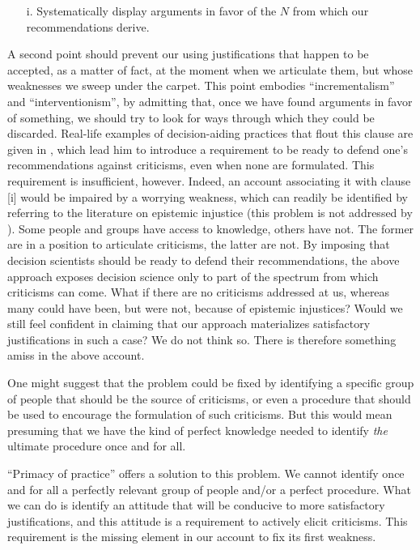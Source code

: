 \documentclass[preprint, french, english, 11pt, authoryear]{elsarticle}%
\begin{document}
\begin{itemize}
\item[i.]	Systematically display arguments in favor of the $N$ from which our recommendations derive.
\end{itemize}

A second point should prevent our using justifications that happen to be accepted, as a matter of fact, at the moment when we articulate them, but whose weaknesses we sweep under the carpet. This point embodies “incrementalism” and ``interventionism'', by admitting that, once we have found arguments in favor of something, we should try to look for ways through which they could be discarded. Real-life examples of decision-aiding practices that flout this clause are given in \cite{meinard_what_2017}, which lead him to introduce a requirement to be ready to defend one's recommendations against criticisms, even when none are formulated. This requirement is insufficient, however. Indeed, an account associating it with clause [i] would be impaired by a worrying weakness, which can readily be identified by referring to the literature on epistemic injustice \citep{fricker_epistemic_2007} (this problem is not addressed by \cite{meinard_what_2017}). Some people and groups have access to knowledge, others have not. The former are in a position to articulate criticisms, the latter are not. By imposing that decision scientists should be ready to defend their recommendations, the above approach exposes decision science only to part of the spectrum from which criticisms can come. What if there are no criticisms addressed at us, whereas many could have been, but were not, because of epistemic injustices? Would we still feel confident in claiming that our approach materializes satisfactory justifications in such a case? We do not think so. There is therefore something amiss in the above account.

One might suggest that the problem could be fixed by identifying a specific group of people that should be the source of criticisms, or even a procedure that should be used to encourage the formulation of such criticisms. But this would mean presuming that we have the kind of perfect knowledge needed to identify \emph{the} ultimate procedure once and for all.

``Primacy of practice” offers a solution to this problem. We cannot identify once and for all a perfectly relevant group of people and/or a perfect procedure. What we can do is identify an attitude that will be conducive to more satisfactory justifications, and this attitude is a requirement to actively elicit criticisms. This requirement is the missing element in our account to fix its first weakness.
\end{document}

